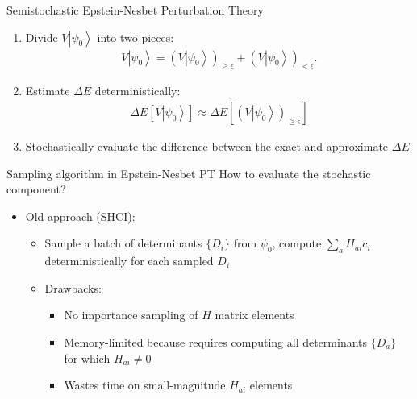 \documentclass[amsmath]{beamer}
\begin{document}
\begin{frame}{Semistochastic Epstein-Nesbet Perturbation Theory}
	\begin{enumerate}
		\item Divide $V\left|\psi_0\right\rangle$ into two pieces:
		\begin{eqnarray}
			V\left|\psi_0\right\rangle = \left(V\left|\psi_0\right\rangle\right)_{\ge \epsilon} + \left(V\left|\psi_0\right\rangle\right)_{<\epsilon}.
		\end{eqnarray}
		\item Estimate $\Delta E$ deterministically:
		\begin{eqnarray}
			\Delta E\left[V\left|\psi_0\right\rangle\right] \approx \Delta E\left[\left(V\left|\psi_0\right\rangle\right)_{\ge \epsilon}\right] 
		\end{eqnarray}
		\item Stochastically evaluate the difference between the exact and approximate $\Delta E$
	\end{enumerate}
\end{frame}

\begin{frame}{Sampling algorithm in Epstein-Nesbet PT}
	How to evaluate the stochastic component?
	\linebreak
	\begin{itemize}
		\item Old approach (SHCI):
		\linebreak
		\begin{itemize}
			\item Sample a batch of determinants $\{D_i\}$ from $\psi_0$, compute $\sum_a H_{ai}c_i$ deterministically for each sampled $D_i$
			\linebreak
			\item Drawbacks:
			\begin{itemize}
				\item No importance sampling of $H$ matrix elements
				\item Memory-limited because requires computing all determinants $\{D_a\}$ for which $H_{ai}\ne 0$
				\item Wastes time on small-magnitude $H_{ai}$ elements
			\end{itemize}
		\end{itemize}
	\end{itemize}
\end{frame}
\end{document}
